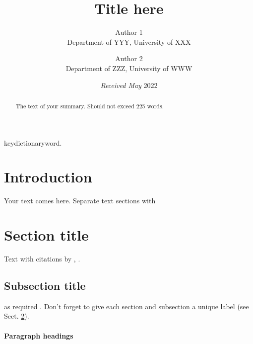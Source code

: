 \documentclass[useAMS,usenatbib,referee]{biom}
\title[]{Title here}
\author{ Author
1 \email{\href{mailto:abc@def}{\nolinkurl{abc@def}}} \\ Department of
YYY, University of XXX  \and
		 Author
2 \email{\href{mailto:djf@wef}{\nolinkurl{djf@wef}}} \\ Department of
ZZZ, University of WWW 
	   }
\begin{document}
\date{{\it Received May} 2022}

\pagerange{\pageref{firstpage}--\pageref{lastpage}} 



\label{firstpage}


\begin{abstract}
The text of your summary. Should not exceed 225 words.
\end{abstract}

%
%

\begin{keywords}
keydictionaryword.
\end{keywords}

\maketitle

\hypertarget{intro}{%
\section{Introduction}\label{intro}}

Your text comes here. Separate text sections with

\hypertarget{sec:1}{%
\section{Section title}\label{sec:1}}

Text with citations by \citet{heagerty2000time},
\citep{pepe2003statistical}.

\hypertarget{sec:2}{%
\subsection{Subsection title}\label{sec:2}}

as required \citep{hoerl1970ridge, zou2005regularization}. Don't forget
to give each section and subsection a unique label (see Sect.
\ref{sec:1}).

\hypertarget{paragraph-headings}{%
\paragraph{Paragraph headings}\label{paragraph-headings}}
\end{document}
